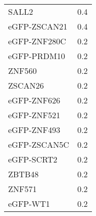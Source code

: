 \begin{longtable}{lr}
        SALL2 &    0.4 \\
 eGFP-ZSCAN21 &    0.4 \\
 eGFP-ZNF280C &    0.2 \\
  eGFP-PRDM10 &    0.2 \\
       ZNF560 &    0.2 \\
      ZSCAN26 &    0.2 \\
  eGFP-ZNF626 &    0.2 \\
  eGFP-ZNF521 &    0.2 \\
  eGFP-ZNF493 &    0.2 \\
 eGFP-ZSCAN5C &    0.2 \\
   eGFP-SCRT2 &    0.2 \\
       ZBTB48 &    0.2 \\
       ZNF571 &    0.2 \\
     eGFP-WT1 &    0.2 \\
\end{longtable}
